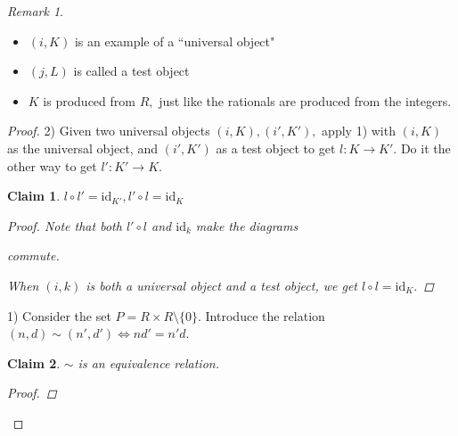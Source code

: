 \documentclass{amsart}
\newtheorem*{claim}{Claim}
\theoremstyle{definition}
\theoremstyle{remark}
\newtheorem*{rmk}{Remark}
\begin{document}
\begin{rmk}

\begin{itemize}
	\item $(i,K)$ is an example of a ``universal object"
	\item $(j,L)$ is called a test object
	\item $K$ is produced from $R,$ just like the rationals are produced from the integers.
\end{itemize}

\end{rmk}
\begin{proof}

2) Given two universal objects $(i,K),(i',K'),$ apply 1) with $(i,K)$ as the universal object, and $(i',K')$ as a test object to get $l:K\rightarrow K'$. Do it the other way to get $l':K'\longrightarrow K.$

\begin{claim}

$l\circ l'=\text{id}_{K'},l'\circ l=\text{id}_K$

\begin{proof}

Note that both $l'\circ l$ and $\text{id}_k$ make the diagrams


 commute.

When $(i,k)$ is both a universal object and a test object, we get $l\circ l=\text{id}_K.$ \end{proof}
\end{claim}


1) Consider the set $P=R\times R\setminus\{0\}$. Introduce the relation $(n,d)\sim (n',d')\iff nd'=n'd$.

\begin{claim}

$\sim$ is an equivalence relation.

\begin{proof}


\end{proof}
\end{claim}
\end{proof}
\end{document}
